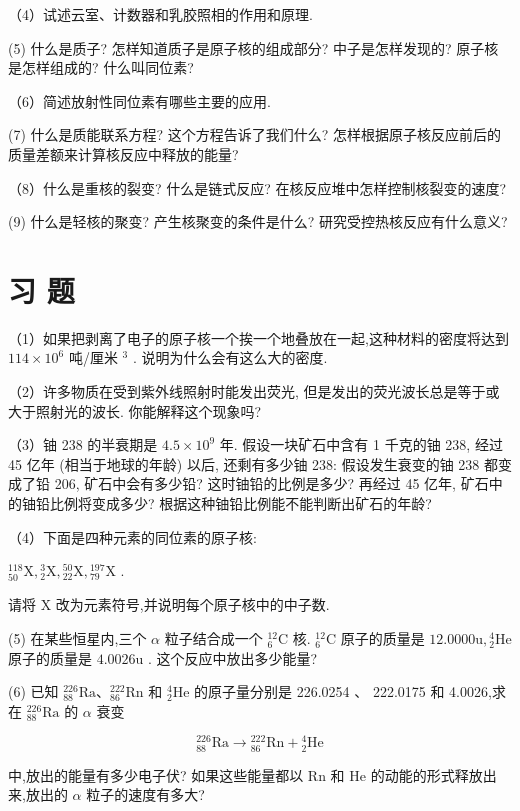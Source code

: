 \documentclass[10pt]{article}
\begin{document}
（4）试述云室、计数器和乳胶照相的作用和原理.

(5) 什么是质子? 怎样知道质子是原子核的组成部分? 中子是怎样发现的? 原子核是怎样组成的? 什么叫同位素?

（6）简述放射性同位素有哪些主要的应用.

(7) 什么是质能联系方程? 这个方程告诉了我们什么? 怎样根据原子核反应前后的质量差额来计算核反应中释放的能量?

（8）什么是重核的裂变? 什么是链式反应? 在核反应堆中怎样控制核裂变的速度?

(9) 什么是轻核的聚变? 产生核聚变的条件是什么? 研究受控热核反应有什么意义?

\section*{习 题}

（1）如果把剥离了电子的原子核一个挨一个地叠放在一起,这种材料的密度将达到 \({114} \times {10}^{6}\) 吨/厘米 \({}^{3}\) . 说明为什么会有这么大的密度.

（2）许多物质在受到紫外线照射时能发出荧光, 但是发出的荧光波长总是等于或大于照射光的波长. 你能解释这个现象吗?

（3）铀 238 的半衰期是 \({4.5} \times {10}^{9}\) 年. 假设一块矿石中含有 1 千克的铀 238, 经过 45 亿年 (相当于地球的年龄) 以后, 还剩有多少铀 238: 假设发生衰变的铀 238 都变成了铅 206, 矿石中会有多少铅? 这时铀铅的比例是多少? 再经过 45 亿年, 矿石中的铀铅比例将变成多少? 根据这种铀铅比例能不能判断出矿石的年龄?

（4）下面是四种元素的同位素的原子核:

\({}_{50}^{118}\mathrm{X},{}_{2}^{3}\mathrm{X},{}_{22}^{50}\mathrm{X},{}_{79}^{197}\mathrm{X}\) .

请将 \(\mathrm{X}\) 改为元素符号,并说明每个原子核中的中子数.

(5) 在某些恒星内,三个 \(\alpha\) 粒子结合成一个 \({}_{6}^{12}\mathrm{C}\) 核. \({}_{6}^{12}\mathrm{C}\) 原子的质量是 \({12.0000}\mathrm{u},{}_{2}^{4}\mathrm{{He}}\) 原子的质量是 \({4.0026}\mathrm{u}\) . 这个反应中放出多少能量?

(6) 已知 \({}_{88}^{226}\mathrm{{Ra}}\text{、}{}_{86}^{222}\mathrm{{Rn}}\) 和 \({}_{2}^{4}\mathrm{{He}}\) 的原子量分别是 226.0254 、 222.0175 和 4.0026,求在 \({}_{88}^{226}\mathrm{{Ra}}\) 的 \(\alpha\) 衰变

\[
{}_{88}^{226}\mathrm{{Ra}} \rightarrow {}_{86}^{222}\mathrm{{Rn}} + {}_{2}^{4}\mathrm{{He}}
\]

中,放出的能量有多少电子伏? 如果这些能量都以 \(\mathrm{{Rn}}\) 和 \(\mathrm{{He}}\) 的动能的形式释放出来,放出的 \(\alpha\) 粒子的速度有多大?
\end{document}
